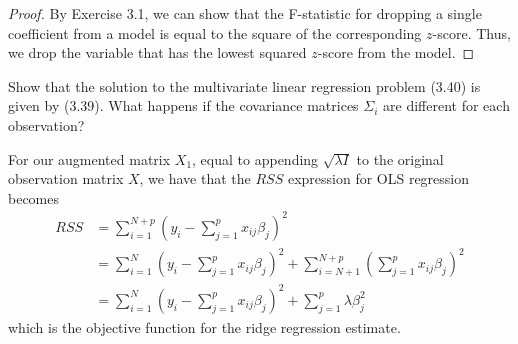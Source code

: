 \begin{proof}
    By Exercise 3.1, we can show that the F-statistic for dropping a single coefficient from a model is equal to the square of the corresponding $z$-score.  Thus, we drop the variable that has the lowest squared $z$-score from the model.
\end{proof}

\begin{exer}
    Show that the solution to the multivariate linear regression problem (3.40) is given by (3.39).  What happens if the covariance matrices $\Sigma_i$ are different for each observation?
\end{exer}


\begin{exer}
    For our augmented matrix $X_1$, equal to appending $\sqrt{\lambda I}$ to the original observation matrix $X$, we have that the $RSS$ expression for OLS regression becomes \begin{align*}
        RSS &= \sum_{i=1}^{N+p} \left(y_i - \sum_{j=1}^p x_{ij} \beta_j \right)^2 \\
            &= \sum_{i=1}^{N} \left( y_i - \sum_{j=1}^p x_{ij} \beta_j \right)^2 + \sum_{i = N + 1}^{N+p} \left(\sum_{j=1}^p x_{ij} \beta_j \right)^2 \\
            &= \sum_{i=1}^{N} \left( y_i - \sum_{j=1}^p x_{ij} \beta_j \right)^2 + \sum_{j=1}^p \lambda \beta_j^2 
    \end{align*} which is the objective function for the ridge regression estimate.
\end{exer}
